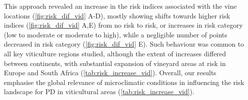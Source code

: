 This approach revealed an increase in the risk indices
associated with the vine locations (\cref{fig:risk_dif_vid} A-D), mostly
showing shifts towards higher risk indices (\cref{fig:risk_dif_vid} A,E) from
no risk to risk, or increases in risk category (low to moderate or moderate to
high), while a negligible number of points decreased in risk category
(\cref{fig:risk_dif_vid} E). Such behaviour was common to all key viticulture
regions studied, although the extent of increases differed between continents,
with substantial expansion of vineyard areas at risk in Europe and South Africa
(\cref{tab:risk_increase_vid}). Overall, our results emphasise the global
relevance of microclimatic conditions in influencing the risk landscape for PD
in viticultural areas (\cref{tab:risk_increase_vid}).

\begin{table}[H]
    \centering
    \caption{Comparison of grapevine presence locations at risk in key
        viticulture regions using CHELSA and ERA5 datasets}
    \label{tab:risk_increase_vid}
\end{table}

